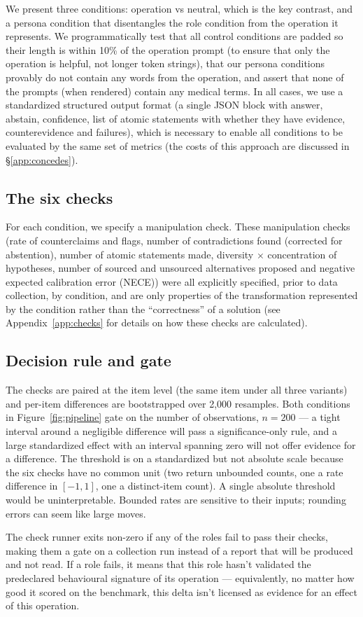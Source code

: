 We present three conditions: operation vs neutral, which is the key contrast, and a persona
condition that disentangles the role condition from the operation it represents. We programmatically
test that all control conditions are padded so their length is within 10\% of the operation prompt
(to ensure that only the operation is helpful, not longer token strings), that our persona
conditions provably do not contain any words from the operation, and assert that none of the prompts
(when rendered) contain any medical terms. In all cases, we use a standardized structured output
format (a single JSON block with answer, abstain, confidence, list of atomic statements with whether
they have evidence, counterevidence and failures), which is necessary to enable all conditions to be
evaluated by the same set of metrics (the costs of this approach are discussed in
\S\ref{app:concedes}).

\subsection{The six checks}
\label{sec:six-checks}

For each condition, we specify a manipulation check. These manipulation checks (rate of
counterclaims and flags, number of contradictions found (corrected for abstention), number of atomic
statements made, diversity $\times$ concentration of hypotheses, number of sourced and unsourced
alternatives proposed and negative expected calibration error (NECE)) were all explicitly specified,
prior to data collection, by condition, and are only properties of the transformation represented by
the condition rather than the ``correctness'' of a solution (see Appendix~\ref{app:checks} for
details on how these checks are calculated).

\subsection{Decision rule and gate}
\label{sec:gate}

The checks are paired at the item level (the same item under all three variants) and per-item
differences are bootstrapped over 2,000 resamples. Both conditions in Figure~\ref{fig:pipeline} gate
on the number of observations, $n = 200$ --- a tight interval around a negligible difference will
pass a significance-only rule, and a large standardized effect with an interval spanning zero will
not offer evidence for a difference. The threshold is on a standardized but not absolute scale
because the six checks have no common unit (two return unbounded counts, one a rate difference in
$[-1, 1]$, one a distinct-item count). A single absolute threshold would be uninterpretable. Bounded
rates are sensitive to their inputs; rounding errors can seem like large moves.

The check runner exits non-zero if any of the roles fail to pass their checks, making them a gate on
a collection run instead of a report that will be produced and not read. If a role fails, it means
that this role hasn't validated the predeclared behavioural signature of its operation ---
equivalently, no matter how good it scored on the benchmark, this delta isn't licensed as evidence
for an effect of this operation.

